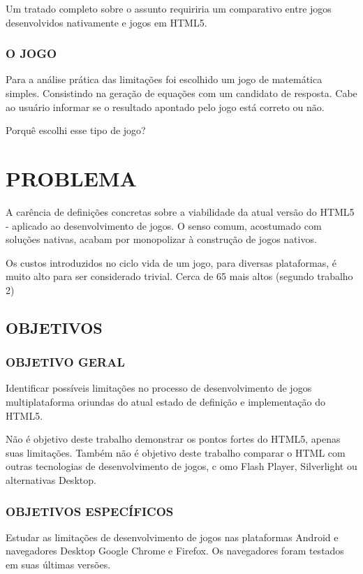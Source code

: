 \documentclass[
12pt,
a4paper,
portuges,
draft
]{report}
\begin{document}
Um tratado completo sobre o assunto requiriria um comparativo entre
jogos desenvolvidos nativamente e jogos em HTML5.

\subsection{O JOGO}

Para a análise prática das limitações foi escolhido um jogo de
matemática simples. Consistindo na geração de equações com um
candidato de resposta. Cabe ao usuário informar se o resultado apontado
pelo jogo está correto ou não.

Porquê escolhi esse tipo de jogo?
\chapter{PROBLEMA}

A carência de definições concretas sobre a viabilidade da atual
versão do HTML5 - aplicado ao desenvolvimento de jogos. O senso comum, 
acostumado com soluções nativas, acabam por monopolizar à construção de jogos nativos.

Os custos introduzidos no ciclo vida de um jogo, para diversas
plataformas, é muito alto para ser considerado trivial. Cerca de 65%
mais altos (segundo trabalho 2)
\section{OBJETIVOS}

\subsection{OBJETIVO GERAL}

Identificar possíveis limitações no processo de desenvolvimento
de jogos multiplataforma oriundas do atual estado de definição e
implementação do HTML5.

Não é objetivo deste trabalho demonstrar os pontos fortes do HTML5,
apenas suas limitações. Também não é objetivo deste trabalho
comparar o HTML com outras tecnologias de desenvolvimento de jogos, c
omo Flash Player, Silverlight ou alternativas Desktop.

\subsection{OBJETIVOS ESPECÍFICOS}

Estudar as limitações de desenvolvimento de jogos nas plataformas
Android e navegadores Desktop Google Chrome
e Firefox. Os navegadores foram testados em suas últimas versões.
\end{document}
